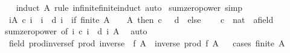 \begin{isabellebody}
%
\isadelimproof
\ \ %
\endisadelimproof
%
\isatagproof
{}\isamarkupfalse%
\ {\isacharparenleft}{\kern0pt}induct\ A\ rule{\isacharcolon}{\kern0pt}\ infinite{\isacharunderscore}{\kern0pt}finite{\isacharunderscore}{\kern0pt}induct{\isacharparenright}{\kern0pt}\ auto%
\endisatagproof
{\isafoldproof}%
%
\isadelimproof
\isanewline
%
\endisadelimproof
\isanewline
{}\isamarkupfalse%
\ sum{\isacharunderscore}{\kern0pt}zero{\isacharunderscore}{\kern0pt}power{\isacharprime}{\kern0pt}\ {\isacharbrackleft}{\kern0pt}simp{\isacharbrackright}{\kern0pt}{\isacharcolon}{\kern0pt}\isanewline
\ \ {\isachardoublequoteopen}{\isacharparenleft}{\kern0pt}{\isasymSum}i{\isasymin}A{\isachardot}{\kern0pt}\ c\ i\ {\isacharasterisk}{\kern0pt}\ {}{\isacharcircum}{\kern0pt}i\ {\isacharslash}{\kern0pt}\ d\ i{\isacharparenright}{\kern0pt}\ {\isacharequal}{\kern0pt}\ {\isacharparenleft}{\kern0pt}if\ finite\ A\ {\isasymand}\ {}\ {\isasymin}\ A\ then\ c\ {}\ {\isacharslash}{\kern0pt}\ d\ {}\ else\ {}{\isacharparenright}{\kern0pt}{\isachardoublequoteclose}\isanewline
\ \ \ c\ {\isacharcolon}{\kern0pt}{\isacharcolon}{\kern0pt}\ {\isachardoublequoteopen}nat\ {\isasymRightarrow}\ {\isacharprime}{\kern0pt}a{\isacharcolon}{\kern0pt}{\isacharcolon}{\kern0pt}field{\isachardoublequoteclose}\isanewline
%
\isadelimproof
\ \ %
\endisadelimproof
%
\isatagproof
{}\isamarkupfalse%
\ sum{\isacharunderscore}{\kern0pt}zero{\isacharunderscore}{\kern0pt}power\ {\isacharbrackleft}{\kern0pt}of\ {\isachardoublequoteopen}{\isasymlambda}i{\isachardot}{\kern0pt}\ c\ i\ {\isacharslash}{\kern0pt}\ d\ i{\isachardoublequoteclose}\ A{\isacharbrackright}{\kern0pt}\ \isamarkupfalse%
\ auto%
\endisatagproof
{\isafoldproof}%
%
\isadelimproof
\isanewline
%
\endisadelimproof
\isanewline
{}\isamarkupfalse%
\ {\isacharparenleft}{\kern0pt}\ field{\isacharparenright}{\kern0pt}\ prod{\isacharunderscore}{\kern0pt}inversef{\isacharcolon}{\kern0pt}\ {\isachardoublequoteopen}prod\ {\isacharparenleft}{\kern0pt}inverse\ {\isasymcirc}\ f{\isacharparenright}{\kern0pt}\ A\ {\isacharequal}{\kern0pt}\ inverse\ {\isacharparenleft}{\kern0pt}prod\ f\ A{\isacharparenright}{\kern0pt}{\isachardoublequoteclose}\isanewline
%
\isadelimproof
\ %
\endisadelimproof
%
\isatagproof
{}\isamarkupfalse%
\ {\isacharparenleft}{\kern0pt}cases\ {\isachardoublequoteopen}finite\ A{\isachardoublequoteclose}{\isacharparenright}{\kern0pt}\isanewline
\ \ \ \isamarkupfalse%

\end{isabellebody}
